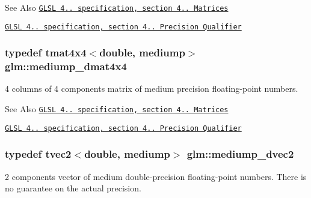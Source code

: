 \begin{DoxySeeAlso}{See Also}
\href{http://www.opengl.org/registry/doc/GLSLangSpec.4.20.8.pdf}{\tt G\-L\-S\-L 4.. specification, section 4.. Matrices} 

\href{http://www.opengl.org/registry/doc/GLSLangSpec.4.20.8.pdf}{\tt G\-L\-S\-L 4.. specification, section 4.. Precision Qualifier} 
\end{DoxySeeAlso}
\hypertarget{group__core__precision_ga6dc4057e30931ebd0b5d7e44ef27763a}{
\subsubsection[{mediump\-\_\-dmat4x4}]{\setlength{\rightskip}{0pt plus 5cm}typedef tmat4x4$<$double, mediump$>$ {\bf glm\-::mediump\-\_\-dmat4x4}}}\label{group__core__precision_ga6dc4057e30931ebd0b5d7e44ef27763a}
4 columns of 4 components matrix of medium precision floating-\/point numbers.

\begin{DoxySeeAlso}{See Also}
\href{http://www.opengl.org/registry/doc/GLSLangSpec.4.20.8.pdf}{\tt G\-L\-S\-L 4.. specification, section 4.. Matrices} 

\href{http://www.opengl.org/registry/doc/GLSLangSpec.4.20.8.pdf}{\tt G\-L\-S\-L 4.. specification, section 4.. Precision Qualifier} 
\end{DoxySeeAlso}
\hypertarget{group__core__precision_gafc1ed63d5e5d1ddcf67752143f4f5871}{
\subsubsection[{mediump\-\_\-dvec2}]{\setlength{\rightskip}{0pt plus 5cm}typedef tvec2$<$double, mediump$>$ {\bf glm\-::mediump\-\_\-dvec2}}}\label{group__core__precision_gafc1ed63d5e5d1ddcf67752143f4f5871}
2 components vector of medium double-\/precision floating-\/point numbers. There is no guarantee on the actual precision.


